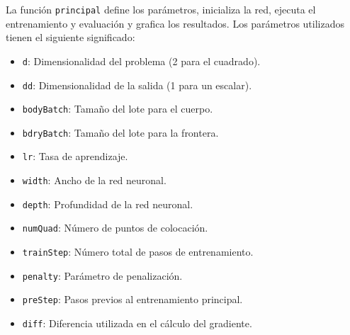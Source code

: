 \documentclass[a4paper,11pt,spanish, twoside, leqno]{tfg-uam}
\theoremstyle{definition}
\begin{document}
La función \texttt{principal} define los parámetros, inicializa la red, ejecuta el entrenamiento y evaluación y grafica los resultados. Los parámetros utilizados tienen el siguiente significado:
\begin{itemize}
    \item \texttt{d}: Dimensionalidad del problema (2 para el cuadrado).
    \item \texttt{dd}: Dimensionalidad de la salida (1 para un escalar).
    \item \texttt{bodyBatch}: Tamaño del lote para el cuerpo.
    \item \texttt{bdryBatch}: Tamaño del lote para la frontera.
    \item \texttt{lr}: Tasa de aprendizaje.
    \item \texttt{width}: Ancho de la red neuronal.
    \item \texttt{depth}: Profundidad de la red neuronal.
    \item \texttt{numQuad}: Número de puntos de colocación.
    \item \texttt{trainStep}: Número total de pasos de entrenamiento.
    \item \texttt{penalty}: Parámetro de penalización.
    \item \texttt{preStep}: Pasos previos al entrenamiento principal.
    \item \texttt{diff}: Diferencia utilizada en el cálculo del gradiente.
\end{itemize}
\end{document}
